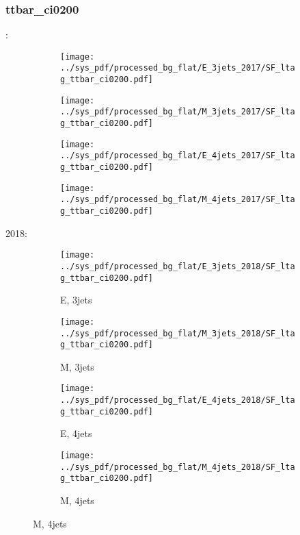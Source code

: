 \documentclass{beamer}
\begin{document}
\begin{frame}
\frametitle{ttbar_ci0200}
\fontsize{5}{1}:
\begin{figure}
\centering
\begin{subfigure}[b]{0.24\textwidth}
\texttt{[image: ../sys\_pdf/processed\_bg\_flat/E\_3jets\_2017/SF\_ltag\_ttbar\_ci0200.pdf]}
\end{subfigure}
\begin{subfigure}[b]{0.24\textwidth}
\texttt{[image: ../sys\_pdf/processed\_bg\_flat/M\_3jets\_2017/SF\_ltag\_ttbar\_ci0200.pdf]}
\end{subfigure}
\begin{subfigure}[b]{0.24\textwidth}
\texttt{[image: ../sys\_pdf/processed\_bg\_flat/E\_4jets\_2017/SF\_ltag\_ttbar\_ci0200.pdf]}
\end{subfigure}
\begin{subfigure}[b]{0.24\textwidth}
\texttt{[image: ../sys\_pdf/processed\_bg\_flat/M\_4jets\_2017/SF\_ltag\_ttbar\_ci0200.pdf]}
\end{subfigure}
\end{figure}
2018:
\begin{figure}
\centering
\begin{subfigure}[b]{0.24\textwidth}
\texttt{[image: ../sys\_pdf/processed\_bg\_flat/E\_3jets\_2018/SF\_ltag\_ttbar\_ci0200.pdf]}
\captionsetup{font=tiny}
\caption{E, 3jets}
\end{subfigure}
\begin{subfigure}[b]{0.24\textwidth}
\texttt{[image: ../sys\_pdf/processed\_bg\_flat/M\_3jets\_2018/SF\_ltag\_ttbar\_ci0200.pdf]}
\captionsetup{font=tiny}
\caption{M, 3jets}
\end{subfigure}
\begin{subfigure}[b]{0.24\textwidth}
\texttt{[image: ../sys\_pdf/processed\_bg\_flat/E\_4jets\_2018/SF\_ltag\_ttbar\_ci0200.pdf]}
\captionsetup{font=tiny}
\caption{E, 4jets}
\end{subfigure}
\begin{subfigure}[b]{0.24\textwidth}
\texttt{[image: ../sys\_pdf/processed\_bg\_flat/M\_4jets\_2018/SF\_ltag\_ttbar\_ci0200.pdf]}
\captionsetup{font=tiny}
\caption{M, 4jets}
\end{subfigure}
\end{figure}
\end{frame}
\end{document}
